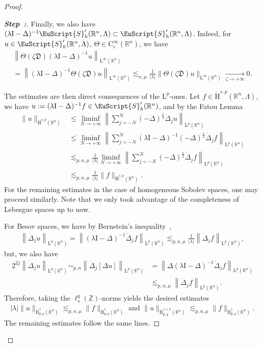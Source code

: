 \documentclass[AHL,Unicode,longabstracts,published]{cedram}
\newcommand{\bbR}{\mathbb{R}}
\newcommand{\bbZ}{\mathbb{Z}}
\newcommand{\rmH}{\mathrm{H}}%
\newcommand{\rmB}{\mathrm{B}}
\newcommand{\rmL}{\mathrm{L}}
\newcommand{\rmC}{\mathrm{C}}
\newcommand{\rmI}{\mathrm{I}}
\newcommand{\fkD}{\mathfrak{D}}
\newcommand{\eus}{\EuScript}
\newcounter{stepcount}
\newenvironment{step}{\refstepcounter{stepcount}\begin{proof}[\textbf{Step~\thestepcount:}]}{\let\qed\relax\end{proof}}
\begin{document}
\begin{proof}
\begin{step}
Finally, we also have $(\lambda\rmI -\Delta)^{-1}\eus{S}'_h(\bbR^n,\Lambda)\subset\eus{S}'_h(\bbR^n,\Lambda)$. Indeed, for $u\in \eus{S}'_h(\bbR^n,\Lambda)$, $\Theta \in \rmC _c^\infty(\bbR^n)$, we have
\begin{multline*}
\left\| \Theta(\zeta \fkD ) (\lambda\rmI -\Delta)^{-1}u\right\|_{\rmL^\infty(\bbR^n)}
\\
=\left\| (\lambda\rmI -\Delta)^{-1}\Theta(\zeta \fkD) u\right\|_{\rmL^\infty(\bbR^n)} \lesssim_{n,\mu} \frac{1}{|\lambda|} \| \Theta(\zeta \fkD) u \|_{\rmL^\infty(\bbR^n)} \xrightarrow[\zeta\rightarrow+\infty]{} 0.
\end{multline*}

The estimates are then direct consequences of the $\rmL^p$-ones. Let $f\in\dot{\rmH}^{s,p}(\bbR^n,\Lambda)$, we have $u:=(\lambda\rmI -\Delta)^{-1}f\in\eus{S}'_h(\bbR^n)$, and by the Fatou Lemma
\begin{align*}
\| u \|_{\dot{\rmH}^{s,p}(\bbR^n)} &\leqslant \liminf_{N\rightarrow+\infty} \left\| \sum_{j=-N}^{N} (-\Delta)^\frac{s}{2}\dot{\Delta}_j u\right\|_{{\rmL}^{p}(\bbR^n)}\\ 
&\leqslant \liminf_{N\rightarrow+\infty} \left\| \sum_{j=-N}^{N} (\lambda \rmI -\Delta)^{-1}(-\Delta)^\frac{s}{2}\dot{\Delta}_j f\right\|_{{\rmL}^{p}(\bbR^n)}\\
&\lesssim_{p,n,\mu} \frac{1}{|\lambda|} \liminf_{N\rightarrow+\infty} \left\| \sum_{j=-N}^{N}(-\Delta)^\frac{s}{2}\dot{\Delta}_j f\right\|_{{\rmL}^{p}(\bbR^n)}\\
&\lesssim_{p,n,\mu} \frac{1}{|\lambda|} \| f\|_{\dot{\rmH}^{s,p}(\bbR^n)}.
\end{align*}
For the remaining estimates in the case of homogeneous Sobolev spaces, one may proceed similarly. Note that we only took advantage of the completeness of Lebesgue spaces up to now.

For Besov spaces, we have by Bernstein's inequality~\cite[Lemma~2.1]{bookBahouriCheminDanchin},
\begin{align*}
\left\| \dot{\Delta}_j u\right\|_{\rmL^{{p}}(\bbR^n)} = \left\| (\lambda\rmI -\Delta)^{-1} \dot{\Delta}_j f\right\|_{\rmL^{{p}}(\bbR^n)} \lesssim_{p,n,\mu} \frac{1}{|\lambda|}\left\| \dot{\Delta}_j f\right\|_{\rmL^{{p}}(\bbR^n)},
\end{align*}
but, we also have
\begin{align*}
2^{2j}\left\| \dot{\Delta}_j u\right\|_{\rmL^{{p}}(\bbR^n)}\sim_{{p},n} \left\| \dot{\Delta}_j [\Delta u]\right\|_{\rmL^{p}(\bbR^n)} &=
\left\| \Delta(\lambda\rmI -\Delta)^{-1} \dot{\Delta}_j f\right\|_{\rmL^{p}(\bbR^n)} 
\\
&\lesssim_{p,n,\mu}\left\| \dot{\Delta}_j f\right\|_{\rmL^{{p}}(\bbR^n)}.
\end{align*}
Therefore, taking the $\ell^q_s(\bbZ)$-norms yields the desired estimates
\begin{align*}
|\lambda|\| u \|_{\dot{\rmB}^{s}_{p,q}(\bbR^n)}\lesssim_{p,n,\mu} \| f \|_{\dot{\rmB}^{s}_{p,q}(\bbR^n)} \text{ and } \| u \|_{\dot{\rmB}^{s+2}_{p,q}(\bbR^n)}\lesssim_{p,n,\mu} \| f \|_{\dot{\rmB}^{s}_{p,q}(\bbR^n)}.
\end{align*}
The remaining estimates follow the same lines.


\end{step}
\end{proof}
\end{document}
